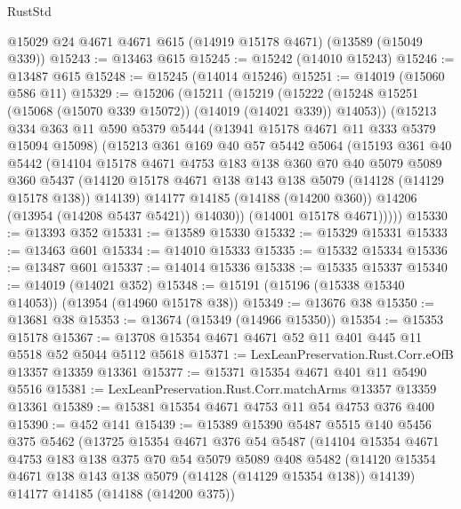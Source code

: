 \begin{lexlean}{RustStd}
\begin{coremodule}
    @15029
    @24
    @4671
    @4671
    @615
    (@14919 @15178 @4671)
    (@13589 (@15049 @339))
@15243 := @13463 @615
@15245 := @15242 (@14010 @15243)
@15246 := @13487 @615
@15248 := @15245 (@14014 @15246)
@15251 := @14019 (@15060 @586 @11)
@15329 := @15206
    (@15211
      (@15219
        (@15222 (@15248 @15251 (@15068 (@15070 @339 @15072)) (@14019 (@14021 @339)) @14053))
        (@15213
          @334
          @363
          @11
          @590
          @5379
          @5444
          (@13941 @15178 @4671 @11 @333 @5379 @15094 @15098)
          (@15213
            @361
            @169
            @40
            @57
            @5442
            @5064
            (@15193
              @361
              @40
              @5442
              (@14104
                @15178
                @4671
                @4753
                @183
                @138
                @360
                @70
                @40
                @5079
                @5089
                @360
                @5437
                (@14120 @15178 @4671 @138 @143 @138 @5079 (@14128 (@14129 @15178 @138)) @14139)
                @14177
                @14185
                (@14188 (@14200 @360))
                @14206
                (@13954 (@14208 @5437 @5421))
                @14030))
            (@14001 @15178 @4671)))))
@15330 := @13393 @352
@15331 := @13589 @15330
@15332 := @15329 @15331
@15333 := @13463 @601
@15334 := @14010 @15333
@15335 := @15332 @15334
@15336 := @13487 @601
@15337 := @14014 @15336
@15338 := @15335 @15337
@15340 := @14019 (@14021 @352)
@15348 := @15191 (@15196 (@15338 @15340 @14053)) (@13954 (@14960 @15178 @38))
@15349 := @13676 @38
@15350 := @13681 @38
@15353 := @13674 (@15349 (@14966 @15350))
@15354 := @15353 @15178
@15367 := @13708 @15354 @4671 @4671 @52 @11 @401 @445 @11 @5518 @52 @5044 @5112 @5618
@15371 := LexLeanPreservation.Rust.Corr.eOfB @13357 @13359 @13361
@15377 := @15371 @15354 @4671 @401 @11 @5490 @5516
@15381 := LexLeanPreservation.Rust.Corr.matchArms @13357 @13359 @13361
@15389 := @15381 @15354 @4671 @4753 @11 @54 @4753 @376 @400
@15390 := @452 @141
@15439 := @15389
    @15390
    @5487
    @5515
    @140
    @5456
    @375
    @5462
    (@13725
      @15354
      @4671
      @376
      @54
      @5487
      (@14104
        @15354
        @4671
        @4753
        @183
        @138
        @375
        @70
        @54
        @5079
        @5089
        @408
        @5482
        (@14120 @15354 @4671 @138 @143 @138 @5079 (@14128 (@14129 @15354 @138)) @14139)
        @14177
        @14185
        (@14188 (@14200 @375))

\end{coremodule}
\end{lexlean}
